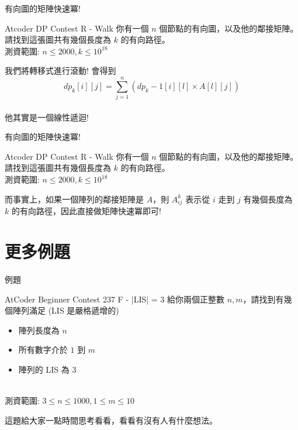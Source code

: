 \documentclass[aspectratio=169]{beamer}
\begin{document}
\begin{frame}[fragile]{有向圖的矩陣快速冪!}
    \begin{block}{Atcoder DP Contest R - Walk}
        你有一個 $n$ 個節點的有向圖，以及他的鄰接矩陣。請找到這張圖共有幾個長度為 $k$ 的有向路徑。\\ 
        \vspace{5mm}
        測資範圍: $n \le 2000, k \le 10^{18}$
    \end{block}
    我們將轉移式進行滾動! 會得到
        $$dp_k[i][j]= \sum_{j=1}^n(dp_k-1[i][l] \times A[l][j])$$ \\
    他其實是一個線性遞迴!
\end{frame}

\begin{frame}[fragile]{有向圖的矩陣快速冪!}
    \begin{block}{Atcoder DP Contest R - Walk}
        你有一個 $n$ 個節點的有向圖，以及他的鄰接矩陣。請找到這張圖共有幾個長度為 $k$ 的有向路徑。\\ 
        \vspace{5mm}
        測資範圍: $n \le 2000, k \le 10^{18}$
    \end{block}
    而事實上，如果一個陣列的鄰接矩陣是 $A$，則 $A^k_{ij}$ 表示從 $i$ 走到 $j$ 有幾個長度為 $k$ 的有向路徑，因此直接做矩陣快速冪即可!
\end{frame}

\section{更多例題}

\begin{frame}{例題}
    \begin{block}{AtCoder Beginner Contest 237 F - |LIS| = 3}
        給你兩個正整數 $n,m$，請找到有幾個陣列滿足 (LIS 是嚴格遞增的)
        \begin{itemize}
            \item 陣列長度為 $n$
            \item 所有數字介於 $1$ 到 $m$
            \item 陣列的 LIS 為 $3$
        \end{itemize} \\ 
        \vspace{5mm}
        測資範圍: $3 \le n \le 1000, 1 \le m \le 10$
    \end{block} \pause
    這題給大家一點時間思考看看，看看有沒有人有什麼想法。
\end{frame}
\end{document}
